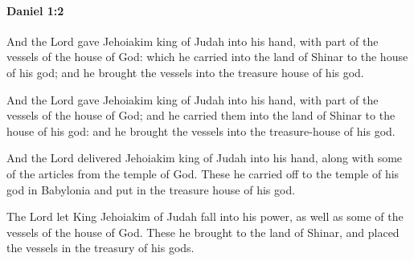 		\paragraph{Daniel 1:2} %
			\label{DANIEL-1-2}

			And the Lord gave Jehoiakim king of Judah into his hand, with part of the vessels of the house of God: which he carried into the land of Shinar to the house of his god; and he brought the vessels into the treasure house of his god.

			\begin{versebox}
					\item[BHS] 
					\item[LXX] 
					\item[ASV] And the Lord gave Jehoiakim king of Judah into his hand, with part of the vessels of the house of God; and he carried them into the land of Shinar to the house of his god: and he brought the vessels into the treasure-house of his god.
					\item[NIV] And the Lord delivered Jehoiakim king of Judah into his hand, along with some of the articles from the temple of God. These he carried off to the temple of his god in Babylonia and put in the treasure house of his god.
					\item[NRSV] The Lord let King Jehoiakim of Judah fall into his power, as well as some of the vessels of the house of God. These he brought to the land of Shinar, and placed the vessels in the treasury of his gods.
			\end{versebox}


